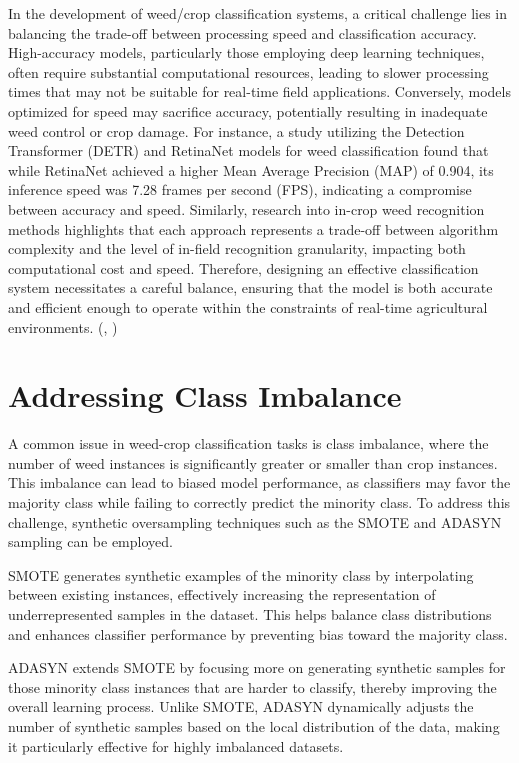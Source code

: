 \documentclass[letterpaper]{report}
\begin{document}
In the development of weed/crop classification systems, a critical challenge lies in balancing the trade-off between processing speed and classification accuracy. High-accuracy models, particularly those employing deep learning techniques, often require substantial computational resources, leading to slower processing times that may not be suitable for real-time field applications. Conversely, models optimized for speed may sacrifice accuracy, potentially resulting in inadequate weed control or crop damage. For instance, a study utilizing the Detection Transformer (DETR) and RetinaNet models for weed classification found that while RetinaNet achieved a higher Mean Average Precision (\gls{MAP}) of 0.904, its inference speed was 7.28 frames per second (FPS), indicating a compromise between accuracy and speed. Similarly, research into in-crop weed recognition methods highlights that each approach represents a trade-off between algorithm complexity and the level of in-field recognition granularity, impacting both computational cost and speed. Therefore, designing an effective classification system necessitates a careful balance, ensuring that the model is both accurate and efficient enough to operate within the constraints of real-time agricultural environments. (\cite{Islam2025-wd}, \cite{Hu2024-nv})

\section{Addressing Class Imbalance}

A common issue in weed-crop classification tasks is class imbalance, where the number of weed instances is significantly greater or smaller than crop instances. This imbalance can lead to biased model performance, as classifiers may favor the majority class while failing to correctly predict the minority class. To address this challenge, synthetic oversampling techniques such as the \gls{SMOTE} and \gls{ADASYN} sampling can be employed.

SMOTE generates synthetic examples of the minority class by interpolating between existing instances, effectively increasing the representation of underrepresented samples in the dataset. This helps balance class distributions and enhances classifier performance by preventing bias toward the majority class.

ADASYN extends SMOTE by focusing more on generating synthetic samples for those minority class instances that are harder to classify, thereby improving the overall learning process. Unlike SMOTE, ADASYN dynamically adjusts the number of synthetic samples based on the local distribution of the data, making it particularly effective for highly imbalanced datasets.
\end{document}

